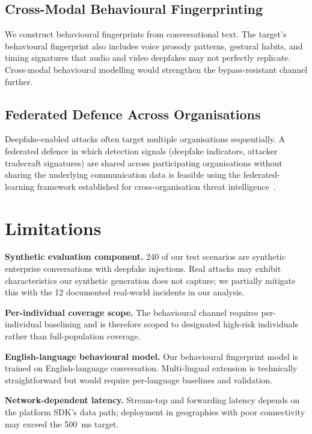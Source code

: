 \documentclass[sigconf,nonacm]{acmart}
\begin{document}
\subsection{Cross-Modal Behavioural Fingerprinting}

We construct behavioural fingerprints from conversational text. The
target's behavioural fingerprint also includes voice prosody patterns,
gestural habits, and timing signatures that audio and video deepfakes
may not perfectly replicate. Cross-modal behavioural modelling would
strengthen the bypass-resistant channel further.

\subsection{Federated Defence Across Organisations}

Deepfake-enabled attacks often target multiple organisations
sequentially. A federated defence in which detection signals (deepfake
indicators, attacker tradecraft signatures) are shared across
participating organisations without sharing the underlying communication
data is feasible using the federated-learning framework
established for cross-organisation threat
intelligence~\cite{kairouz2024fedml}.

\section{Limitations}

\textbf{Synthetic evaluation component.} 240 of our test scenarios are
synthetic enterprise conversations with deepfake injections. Real
attacks may exhibit characteristics our synthetic generation does not
capture; we partially mitigate this with the 12 documented real-world
incidents in our analysis.

\textbf{Per-individual coverage scope.} The behavioural channel
requires per-individual baselining and is therefore scoped to
designated high-risk individuals rather than full-population
coverage.

\textbf{English-language behavioural model.} Our behavioural fingerprint
model is trained on English-language conversation. Multi-lingual
extension is technically straightforward but would require per-language
baselines and validation.

\textbf{Network-dependent latency.} Stream-tap and forwarding latency
depends on the platform SDK's data path; deployment in geographies
with poor connectivity may exceed the 500~ms target.
\end{document}
